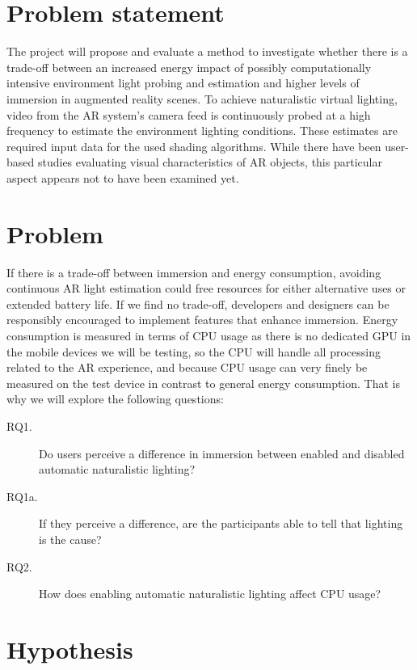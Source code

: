 \documentclass[12pt,twoside,english]{article}
\begin{document}
\section{Problem statement}
\label{sect:problem_statement}

The project will propose and evaluate a method to investigate whether there is a trade-off between an increased energy impact of possibly computationally intensive environment light probing and estimation and higher levels of immersion in augmented reality scenes.
To achieve naturalistic virtual lighting, video from the AR system's camera feed is continuously probed at a high frequency to estimate the environment lighting conditions.
These estimates are required input data for the used shading algorithms.
While there have been user-based studies evaluating visual characteristics of \gls{AR} objects, this particular aspect appears not to have been examined yet.

\section{Problem}
\label{sect:problem}

If there is a trade-off between immersion and energy consumption, avoiding continuous \gls{AR} light estimation could free resources for either alternative uses or extended battery life.
If we find no trade-off, developers and designers can be responsibly encouraged to implement features that enhance immersion.
Energy consumption is measured in terms of \gls{CPU} usage as there is no dedicated \gls{GPU} in the mobile devices we will be testing, so the \gls{CPU} will handle all processing related to the \gls{AR} experience, and because CPU usage can very finely be measured on the test device in contrast to general energy consumption.
That is why we will explore the following questions:

\begin{description}
    \item[RQ1.] Do users perceive a difference in immersion between enabled and disabled automatic naturalistic lighting?
    \item[RQ1a.] If they perceive a difference, are the participants able to tell that lighting is the cause?
    \item[RQ2.] How does enabling automatic naturalistic lighting affect \gls{CPU} usage?
\end{description}

\section{Hypothesis}
\label{sect:hypothesis}
\end{document}
